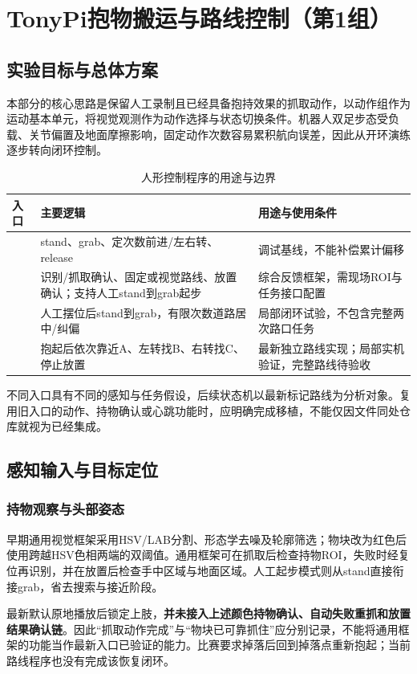 \section{TonyPi抱物搬运与路线控制（第1组）}
\subsection{实验目标与总体方案}
本部分的核心思路是保留人工录制且已经具备抱持效果的抓取动作，以动作组作为运动基本单元，将视觉观测作为动作选择与状态切换条件。机器人双足步态受负载、关节偏置及地面摩擦影响，固定动作次数容易累积航向误差，因此从开环演练逐步转向闭环控制。
\begin{table}[H]\centering\small
\caption{人形控制程序的用途与边界}
\begin{tabularx}{\linewidth}{p{36mm}YY}\toprule
入口 & 主要逻辑 & 用途与使用条件\\\midrule
{} & stand、grab、定次数前进/左右转、release & 调试基线，不能补偿累计偏移\\
 & 识别/抓取确认、固定或视觉路线、放置确认；支持人工stand到grab起步 & 综合反馈框架，需现场ROI与任务接口配置\\
 & 人工摆位后stand到grab，有限次数道路居中/纠偏 & 局部闭环试验，不包含完整两次路口任务\\
 & 抱起后依次靠近A、左转找B、右转找C、停止放置 & 最新独立路线实现；局部实机验证，完整路线待验收\\\bottomrule
\end{tabularx}\end{table}

不同入口具有不同的感知与任务假设，后续状态机以最新标记路线为分析对象。复用旧入口的动作、持物确认或心跳功能时，应明确完成移植，不能仅因文件同处仓库就视为已经集成。

\subsection{感知输入与目标定位}
\subsubsection{持物观察与头部姿态}
早期通用视觉框架采用HSV/LAB分割、形态学去噪及轮廓筛选；物块改为红色后使用跨越HSV色相两端的双阈值。通用框架可在抓取后检查持物ROI，失败时经复位再识别，并在放置后检查手中区域与地面区域。人工起步模式则从stand直接衔接grab，省去搜索与接近阶段。

最新默认原地播放后锁定上肢，\textbf{并未接入上述颜色持物确认、自动失败重抓和放置结果确认链}。因此“抓取动作完成”与“物块已可靠抓住”应分别记录，不能将通用框架的功能当作最新入口已验证的能力。比赛要求掉落后回到掉落点重新抱起；当前路线程序也没有完成该恢复闭环。

